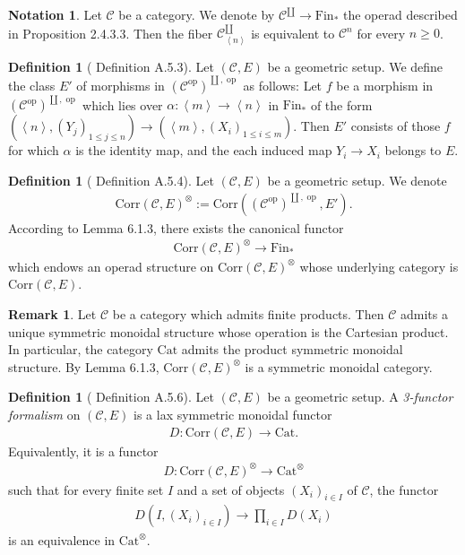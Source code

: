 \documentclass[a4paper,dvipdfmx,11pt,reqno]{amsart}
\DeclareMathOperator{\myop}{op}
\newcommand{\C}{\mathcal{C}}
\newcommand{\Cat}{\mathrm{Cat}}
\newcommand{\Corr}{\mathrm{Corr}}
\newcommand{\Fin}{\mathrm{Fin}}
\renewcommand{\angle}[1]{\left\langle #1 \right\rangle}
\theoremstyle{definition}
\newtheorem{definition}[theorem]{Definition}
\newtheorem{notation}[theorem]{Notation}
\newtheorem{remark}[theorem]{Remark}
\begin{document}
\begin{notation}
  Let $\C$ be a category.
  We denote by $\C^{\coprod} \to \Fin_{*}$ the operad described in \cite{HA} Proposition 2.4.3.3.
  Then the fiber $\C^{\coprod}_{\angle{n}}$ is equivalent to $\C^{n}$ for every $n \geq 0$.
\end{notation}

\begin{definition}[\cite{Mann22} Definition A.5.3] \label{Mann.def.A.5.3}
  Let $(\C,E)$ be a geometric setup.
  We define the class $E'$ of morphisms in $(\C^{\myop})^{\coprod,\myop}$ as follows:
  Let $f$ be a morphism in $(\C^{\myop})^{\coprod,\myop}$ which lies over $\alpha : \angle{m} \to \angle{n}$ in $\Fin_{*}$ of the form $(\angle{n}, (Y_j)_{1 \leq j \leq n}) \to (\angle{m}, (X_i)_{1 \leq i \leq m})$.
  Then $E'$ consists of those $f$ for which $\alpha$ is the identity map, and the each induced map $Y_i \to X_i$ belongs to $E$.
\end{definition}

\begin{definition}[\cite{Mann22} Definition A.5.4] \label{Mann.def.A.5.4}
  Let $(\C,E)$ be a geometric setup.
  We denote 
  \begin{align*}
    \Corr(\C,E)^{\otimes} := \Corr((\C^{\myop})^{\coprod,\myop}, E').
  \end{align*}
  According to \cite{LZ17} Lemma 6.1.3, there exists the canonical functor 
  \begin{align*}
    \Corr(\C,E)^{\otimes} \to \Fin_{*}
  \end{align*}
  which endows an operad structure on $\Corr(\C,E)^{\otimes}$ whose underlying category is $\Corr(\C,E)$.
\end{definition}

\begin{remark} \label{Mann.A.5.5}
  Let $\C$ be a category which admits finite products.
  Then $\C$ admits a unique symmetric monoidal structure whose operation is the Cartesian product.
  In particular, the category $\Cat$ admits the product symmetric monoidal structure.
  By \cite{LZ17} Lemma 6.1.3, $\Corr(\C,E)^{\otimes}$ is a symmetric monoidal category.
\end{remark}  

\begin{definition}[\cite{Mann22} Definition A.5.6] \label{Mann.def.A.5.6}
  Let $(\C,E)$ be a geometric setup.
  A \textit{3-functor formalism} on $(\C,E)$ is a lax symmetric monoidal functor
  \begin{align*}
    D : \Corr(\C,E) \to \Cat.
  \end{align*}
  Equivalently, it is a functor 
  \begin{align*}
    D : \Corr(\C,E)^{\otimes} \to \Cat^{\otimes}
  \end{align*}
  such that for every finite set $I$ and a set of objects $(X_i)_{i \in I}$ of $\C$, the functor 
  \begin{align*}
    D(I,(X_i)_{i \in I}) \to \prod_{i \in I} D(X_i)
  \end{align*}
  is an equivalence in $\Cat^{\otimes}$.
\end{definition}
\end{document}
